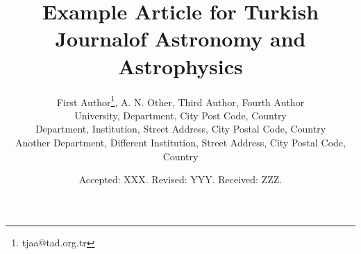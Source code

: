 \documentclass{tjaa}
\begin{document}

\title[Short Title max 45 chars]{Example Article for Turkish Journal\newline of Astronomy and Astrophysics}%

\author[F. Author \others]{%
First Author\thanks{tjaa@tad.org.tr},
A. N. Other,
Third Author,
\newauthor
Fourth Author
\\
University, Department, City Post Code, Country\\
Department, Institution, Street Address, City Postal Code, Country\\
Another Department, Different Institution, Street Address, City Postal Code, Country%
}%
\date{Accepted: XXX. Revised: YYY. Received: ZZZ.}
%
\renewcommand{\pubyear}{0000}
\renewcommand{\volume}{0}
\renewcommand{\issue}{0}
\end{document}

